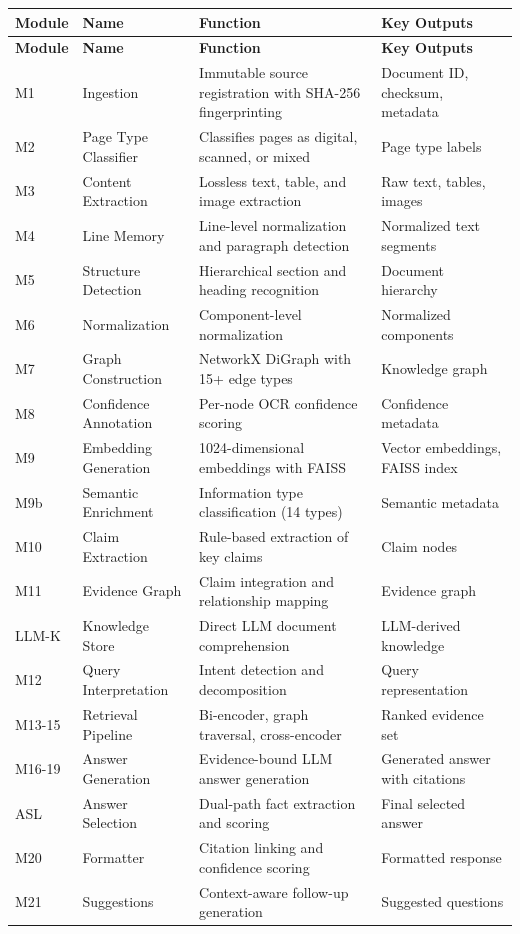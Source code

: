 \documentclass[11pt,a4paper]{article}
\begin{document}
\begin{longtable}{@{}llp{4cm}p{4cm}@{}}
\toprule
\textbf{Module} & \textbf{Name} & \textbf{Function} & \textbf{Key Outputs} \\
\midrule
\endfirsthead

\toprule
\textbf{Module} & \textbf{Name} & \textbf{Function} & \textbf{Key Outputs} \\
\midrule
\endhead

\bottomrule
\endfoot

\bottomrule
\endlastfoot

M1 & Ingestion & Immutable source registration with SHA-256 fingerprinting & Document ID, checksum, metadata \\
M2 & Page Type Classifier & Classifies pages as digital, scanned, or mixed & Page type labels \\
M3 & Content Extraction & Lossless text, table, and image extraction & Raw text, tables, images \\
M4 & Line Memory & Line-level normalization and paragraph detection & Normalized text segments \\
M5 & Structure Detection & Hierarchical section and heading recognition & Document hierarchy \\
M6 & Normalization & Component-level normalization & Normalized components \\
M7 & Graph Construction & NetworkX DiGraph with 15+ edge types & Knowledge graph \\
M8 & Confidence Annotation & Per-node OCR confidence scoring & Confidence metadata \\
M9 & Embedding Generation & 1024-dimensional embeddings with FAISS & Vector embeddings, FAISS index \\
M9b & Semantic Enrichment & Information type classification (14 types) & Semantic metadata \\
M10 & Claim Extraction & Rule-based extraction of key claims & Claim nodes \\
M11 & Evidence Graph & Claim integration and relationship mapping & Evidence graph \\
LLM-K & Knowledge Store & Direct LLM document comprehension & LLM-derived knowledge \\
M12 & Query Interpretation & Intent detection and decomposition & Query representation \\
M13-15 & Retrieval Pipeline & Bi-encoder, graph traversal, cross-encoder & Ranked evidence set \\
M16-19 & Answer Generation & Evidence-bound LLM answer generation & Generated answer with citations \\
ASL & Answer Selection & Dual-path fact extraction and scoring & Final selected answer \\
M20 & Formatter & Citation linking and confidence scoring & Formatted response \\
M21 & Suggestions & Context-aware follow-up generation & Suggested questions \\

\end{longtable}
\end{document}
